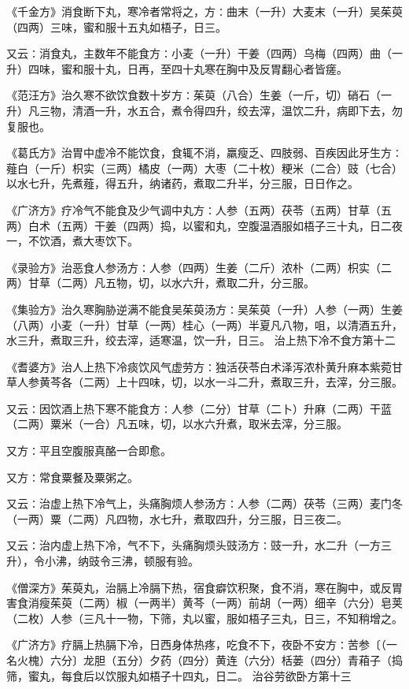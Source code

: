 \documentclass[a4paper,12pt,UTF8,twoside]{ctexbook}
\begin{document}
《千金方》消食断下丸，寒冷者常将之，方∶曲末（一升）大麦末（一升）吴茱萸（四两）三味，蜜和服十五丸如梧子，日三。

又云∶消食丸，主数年不能食方∶小麦（一升）干姜（四两）乌梅（四两）曲（一升）四味，蜜和服十丸，日再，至四十丸寒在胸中及反胃翻心者皆瘥。

《范汪方》治久寒不欲饮食数十岁方∶茱萸（八合）生姜（一斤，切）硝石（一升）凡三物，清酒一升，水五合，煮令得四升，绞去滓，温饮二升，病即下去，勿复服也。

《葛氏方》治胃中虚冷不能饮食，食辄不消，羸瘦乏、四肢弱、百疾因此牙生方∶薤白（一斤）枳实（三两）橘皮（一两）大枣（二十枚）粳米（二合）豉（七合）以水七升，先煮薤，得五升，纳诸药，煮取二升半，分三服，日日作之。

《广济方》疗冷气不能食及少气调中丸方∶人参（五两）茯苓（五两）甘草（五两）白术（五两）干姜（四两）捣，以蜜和丸，空腹温酒服如梧子三十丸，日二夜一，不饮酒，煮大枣饮下。

《录验方》治恶食人参汤方∶人参（四两）生姜（二斤）浓朴（二两）枳实（二两）甘草（二两）凡五物，切，以水六升，煮取二升，分三服。

《集验方》治久寒胸胁逆满不能食吴茱萸汤方∶吴茱萸（一升）人参（一两）生姜（八两）小麦（一升）甘草（一两）桂心（一两）半夏凡八物，咀，以清酒五升，水三升，煮取三升，绞去滓，适寒温，饮一升，日三。
治上热下冷不食方第十二

《耆婆方》治人上热下冷痰饮风气虚劳方∶独活茯苓白术泽泻浓朴黄升麻本紫菀甘草人参黄芩各（二两）上十四味，切，以水一斗二升，煮取三升，去滓，分三服。

又云∶因饮酒上热下寒不能食方∶人参（二分）甘草（二卜）升麻（二两）干蓝（二两）粟米（一合）凡五味，切，以水六升煮，取米去滓，分三服。

又方∶平且空腹服真酪一合即愈。

又方∶常食粟餐及粟粥之。

又云∶治虚上热下冷气上，头痛胸烦人参汤方∶人参（二两）茯苓（三两）麦门冬（一两）粟（二两）凡四物，水七升，煮取四升，分三服，日三夜二。

又云∶治内虚上热下冷，气不下，头痛胸烦头豉汤方∶豉一升，水二升（一方三升），令小沸，纳豉令三沸，顿服有验。

《僧深方》茱萸丸，治膈上冷膈下热，宿食癖饮积聚，食不消，寒在胸中，或反胃害食消瘦茱萸（二两）椒（一两半）黄芩（一两）前胡（一两）细辛（六分）皂荚（二枚）人参（三凡十一物，下筛，丸以蜜，服如梧子三丸，日三，不知稍增之。

《广济方》疗膈上热膈下冷，日西身体热疼，吃食不下，夜卧不安方∶苦参〔（一名火槐）六分〕龙胆（五分）夕药（四分）黄连（六分）栝蒌（四分）青葙子（捣筛，蜜丸，每食后以饮服丸如梧子十四丸，日二。
治谷劳欲卧方第十三
\end{document}
